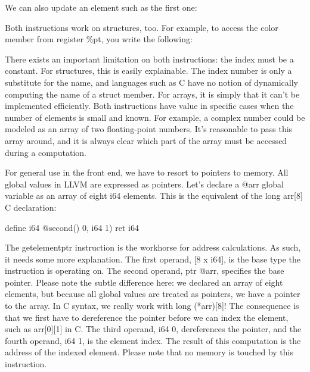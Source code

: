 \begin{shell}
\end{shell}

We can also update an element such as the first one:

\begin{shell}
\end{shell}

Both instructions work on structures, too. For example, to access the color member from register
\%pt, you write the following:

\begin{shell}
\end{shell}

There exists an important limitation on both instructions: the index must be a constant. For structures, this is easily explainable. The index number is only a substitute for the name, and languages such as C have no notion of dynamically computing the name of a struct member. For arrays, it is simply that it can’t be implemented efficiently. Both instructions have value in specific cases when the number of elements is small and known. For example, a complex number could be modeled as an array of two floating-point numbers. It’s reasonable to pass this array around, and it is always clear which part of the array must be accessed during a computation.

For general use in the front end, we have to resort to pointers to memory. All global values in LLVM are expressed as pointers. Let’s declare a @arr global variable as an array of eight i64 elements. This is the equivalent of the long arr[8] C declaration:

\begin{shell}
define i64 @second() {
    0, i64 1)
    ret i64 %
}
\end{shell}

The getelementptr instruction is the workhorse for address calculations. As such, it needs some more explanation. The first operand, [8 x i64], is the base type the instruction is operating on. The second operand, ptr @arr, specifies the base pointer. Please note the subtle difference here: we declared an array of eight elements, but because all global values are treated as pointers, we have a pointer to the array. In C syntax, we really work with long (*arr)[8]! The consequence is that we first have to dereference the pointer before we can index the element, such as arr[0][1] in C. The third operand, i64 0, dereferences the pointer, and the fourth operand, i64 1, is the element index. The result of this computation is the address of the indexed element. Please note that no memory is touched by this instruction.


